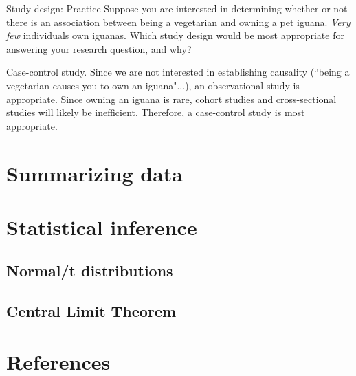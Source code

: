 \documentclass[10pt,t]{beamer}
\begin{document}
\begin{frame}{Study design: Practice}
Suppose you are interested in determining whether or not there is an association between being a vegetarian and owning a pet iguana. \textit{Very few} individuals own iguanas. Which study design would be most appropriate for answering your research question, and why? 

\vspace{0.3cm}

\color{cyan} Case-control study. Since we are not interested in establishing causality (``being a vegetarian causes you to own an iguana"...), an observational study is appropriate. Since owning an iguana is rare, cohort studies and cross-sectional studies will likely be inefficient. Therefore, a case-control study is most appropriate.

\end{frame}

\section{Summarizing data}



\section{Statistical inference}

\subsection{Normal/t distributions}

\subsection{Central Limit Theorem}

\section*{References}
\begin{frame}
\end{frame}
\end{document}
